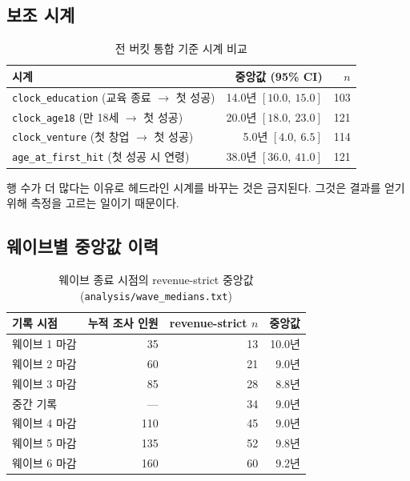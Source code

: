 \documentclass[11pt]{article}
\begin{document}
\subsection{보조 시계}

\begin{table}[h]
\centering
\caption{전 버킷 통합 기준 시계 비교}
\begin{tabular}{L R R}
\toprule
시계 & 중앙값 (95\% CI) & $n$ \\
\midrule
\texttt{clock\_education} (교육 종료 $\to$ 첫 성공) & 14.0년 $[10.0,\ 15.0]$ & 103 \\
\texttt{clock\_age18} (만 18세 $\to$ 첫 성공)       & 20.0년 $[18.0,\ 23.0]$ & 121 \\
\texttt{clock\_venture} (첫 창업 $\to$ 첫 성공)     & \phantom{0}5.0년 $[4.0,\ 6.5]$ & 114 \\
\texttt{age\_at\_first\_hit} (첫 성공 시 연령)      & 38.0년 $[36.0,\ 41.0]$ & 121 \\
\bottomrule
\end{tabular}
\end{table}

행 수가 더 많다는 이유로 헤드라인 시계를 바꾸는 것은 금지된다.
그것은 결과를 얻기 위해 측정을 고르는 일이기 때문이다.

\subsection{웨이브별 중앙값 이력}

\begin{table}[h]
\centering
\caption{웨이브 종료 시점의 revenue-strict 중앙값 (\texttt{analysis/wave\_medians.txt})}
\begin{tabular}{L R R R}
\toprule
기록 시점 & 누적 조사 인원 & revenue-strict $n$ & 중앙값 \\
\midrule
웨이브 1 마감 & \phantom{0}35 & 13 & 10.0년 \\
웨이브 2 마감 & \phantom{0}60 & 21 & \phantom{0}9.0년 \\
웨이브 3 마감 & \phantom{0}85 & 28 & \phantom{0}8.8년 \\
중간 기록     & --- & 34 & \phantom{0}9.0년 \\
웨이브 4 마감 & 110 & 45 & \phantom{0}9.0년 \\
웨이브 5 마감 & 135 & 52 & \phantom{0}9.8년 \\
웨이브 6 마감 & 160 & 60 & \phantom{0}9.2년 \\
\bottomrule
\end{tabular}
\end{table}
\end{document}
